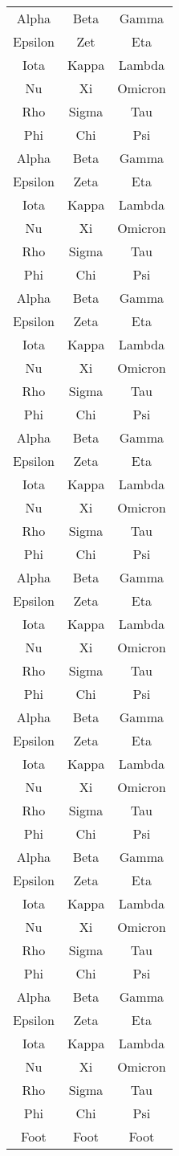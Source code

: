 {\begin{longtable}[c]{ccc}
    Alpha & Beta & Gamma \\
    Epsilon & Zet & Eta \\
    Iota & Kappa & Lambda \\
    Nu & Xi & Omicron \\
    Rho & Sigma & Tau \\
    Phi & Chi & Psi \\
    Alpha & Beta & Gamma \\
    Epsilon & Zeta & Eta \\
    Iota & Kappa & Lambda \\
    Nu & Xi & Omicron \\
    Rho & Sigma & Tau \\
    Phi & Chi & Psi \\
    Alpha & Beta & Gamma \\
    Epsilon & Zeta & Eta \\
    Iota & Kappa & Lambda \\
    Nu & Xi & Omicron \\
    Rho & Sigma & Tau \\
    Phi & Chi & Psi \\
    Alpha & Beta & Gamma \\
    Epsilon & Zeta & Eta \\
    Iota & Kappa & Lambda \\
    Nu & Xi & Omicron \\
    Rho & Sigma & Tau \\
    Phi & Chi & Psi \\
    Alpha & Beta & Gamma \\
    Epsilon & Zeta & Eta \\
    Iota & Kappa & Lambda \\
    Nu & Xi & Omicron \\
    Rho & Sigma & Tau \\
    Phi & Chi & Psi \\
    Alpha & Beta & Gamma \\
    Epsilon & Zeta & Eta \\
    Iota & Kappa & Lambda \\
    Nu & Xi & Omicron \\
    Rho & Sigma & Tau \\
    Phi & Chi & Psi \\
    Alpha & Beta & Gamma \\
    Epsilon & Zeta & Eta \\
    Iota & Kappa & Lambda \\
    Nu & Xi & Omicron \\
    Rho & Sigma & Tau \\
    Phi & Chi & Psi \\
    Alpha & Beta & Gamma \\
    Epsilon & Zeta & Eta \\
    Iota & Kappa & Lambda \\
    Nu & Xi & Omicron \\
    Rho & Sigma & Tau \\
    Phi & Chi & Psi \\
    Foot & Foot & Foot \\
\end{longtable}
}
